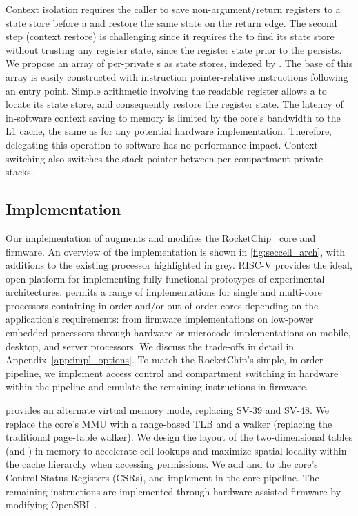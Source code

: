 Context isolation requires the caller to save non-argument/return
registers to a state store before a \sdswitch and restore the same state
on the return edge.
The second step (context restore) is challenging since it
requires the \secdiv to find its state store without trusting any
register state, since the register state prior to the \sdswitch
persists.
We propose an array of per-\secdiv private \cell{}s as 
state stores, indexed by \sid.
The base of this array is easily constructed with
instruction pointer-relative instructions following an entry point.
Simple arithmetic involving the readable \sid register allows
a \secdiv to locate its state store, and consequently restore
the register state.
The latency of in-software context saving to memory is limited by 
the core's bandwidth to the L1 cache, the same as for any potential
hardware implementation.
Therefore, delegating this operation to software has no performance
impact.
Context switching also switches the stack pointer between 
per-compartment private stacks.

\subsection{Implementation}
\label{sec:impl}

Our implementation of \seccells augments and modifies the 
RocketChip~\cite{RocketChip} core and firmware.
An overview of the implementation is shown in 
\autoref{fig:seccell_arch}, with additions to the existing
processor highlighted in grey.
RISC-V provides the ideal, open platform for implementing fully-functional
prototypes of experimental architectures. 
\seccells permits a range of implementations for single and multi-core
processors containing in-order and/or out-of-order cores depending on the 
application's requirements: from firmware implementations on 
low-power embedded processors through hardware or 
microcode implementations on mobile, desktop, and server processors.
We discuss the trade-offs in detail in Appendix~\ref{app:impl_options}.
To match the RocketChip's simple, in-order pipeline, we implement 
access control and compartment switching in hardware within the pipeline 
and emulate the remaining instructions in firmware.

\seccells provides an alternate virtual memory mode, replacing 
SV-39 and SV-48.
We replace the core's MMU with a range-based TLB and a 
\ptable walker (replacing the traditional page-table walker).
We design the layout of the two-dimensional tables (\ptable and \gtable)
in memory to accelerate cell lookups and maximize 
spatial locality within the cache hierarchy when accessing permissions.
We add \sid and \rid to the core's Control-Status Registers (CSRs), 
and implement \sdswitch in the core pipeline.
The remaining instructions are implemented through hardware-assisted firmware 
by modifying OpenSBI~\cite{OpenSBI}.

